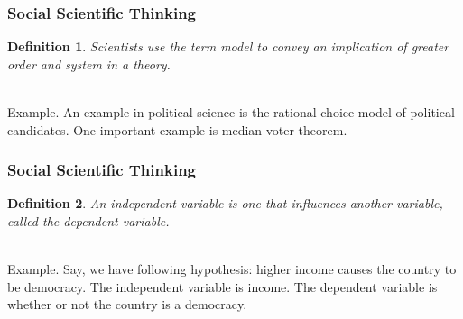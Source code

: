 \documentclass{beamer}
\newtheorem{defn}{Definition}
\numberwithin{equation}{section}
\begin{document}
\begin{frame}
\frametitle{Social Scientific Thinking}

\begin{defn}
Scientists use the term model to convey an implication of greater order and system in a theory.
\end{defn} \pause

\ \\Example. An example in political science is the rational choice model of political candidates. One important example is median voter theorem.

\end{frame}



\begin{frame}
\frametitle{Social Scientific Thinking}

\begin{defn}
An independent variable is one that influences another variable, called the dependent variable.
\end{defn} \pause

\ \\Example. Say, we have following hypothesis: higher income causes the country to be democracy. The independent variable is income. The dependent variable is whether or not the country is a democracy.

\end{frame}
\end{document}
